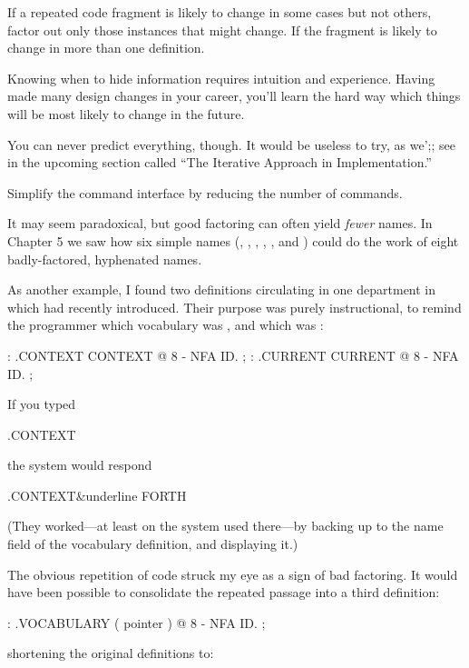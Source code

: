 \begin{tip}
If a repeated code fragment is likely to change in some cases but not
others, factor out only those instances that might change. If the
fragment is likely to change in more than one definition.
\end{tip}
Knowing when to hide information requires intuition and experience.
Having made many design changes in your career, you'll learn the hard
way which things will be most likely to change in the future.

You can never predict everything, though. It would be useless to try,
as we';; see in the upcoming section called ``The Iterative Approach
in Implementation.''

\begin{tip}
Simplify the command interface by reducing the number of commands.
\end{tip}
It may seem paradoxical, but good factoring can often yield
\emph{fewer} names. In Chapter 5 we saw how six simple names
(, , , ,
, and ) could do the work of eight
badly-factored, hyphenated names.

As another example, I found two definitions circulating in one
department in which \Forth{} had recently introduced. Their purpose
was purely instructional, to remind the programmer which vocabulary
was , and which was :

\begin{Code}
: .CONTEXT   CONTEXT @  8 -  NFA  ID. ;
: .CURRENT   CURRENT @  8 -  NFA  ID. ;
\end{Code}
\goodbreak
\noindent If you typed

\begin{Code}
.CONTEXT
\end{Code}
the system would respond

\begin{Code}[commandchars=\&\{\}]
.CONTEXT&underline{ FORTH}
\end{Code}
(They worked---at least on the system used there---by backing up to the
name field of the vocabulary definition, and displaying it.)

The obvious repetition of code struck my eye as a sign of bad
factoring. It would have been possible to consolidate the repeated
passage into a third definition:

\begin{Code}
: .VOCABULARY   ( pointer )  @  8 -  NFA  ID. ;
\end{Code}
shortening the original definitions to:

